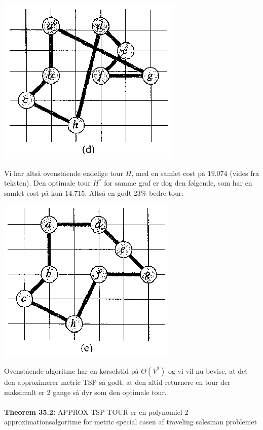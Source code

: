 \begin{center}
 \includegraphics[bb=0 0 247 226,scale=0.7]{img/approxTSP4.png}
\end{center}
Vi har altså ovenstående endelige tour $H$, med en samlet cost på $19.074$ (vides fra teksten). Den optimale tour $H^*$ for samme graf er dog den følgende, som har en samlet cost på kun $14.715$. Altså en godt $23\%$ bedre tour:

\begin{center}
  \includegraphics[bb=0 0 247 226,scale=0.7]{img/approxTSPOpt.png}
\end{center}

Ovenstående algoritme har en kørselstid på $\Theta(V^2)$ og vi vil nu bevise, at det den approximerer metric TSP så godt, at den altid returnere en tour der maksimalt er 2 gange så dyr som den optimale tour.\\
~\\
\textbf{Theorem 35.2:} APPROX-TSP-TOUR er en polynomiel 2-approximationsalgoritme for metric special casen af traveling salesman problemet

